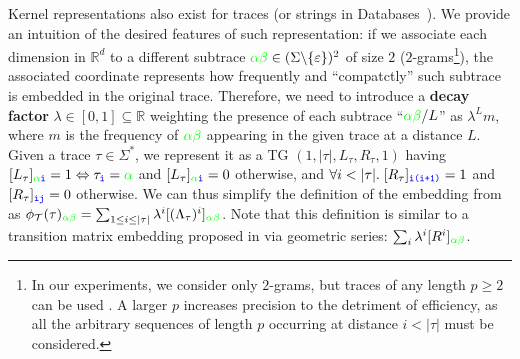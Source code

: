 {Kernel representations also exist for traces (or strings in Databases~\cite{LodhiSSCW02,Raedt,GartnerFW03}). We 
provide an intuition of the desired features of such representation: if we associate each dimension in $\mathbb{R}^d$ to a different subtrace ${\color{green}\alpha\beta}\in(\Sigma\backslash\{\varepsilon\})^2$ of size $2$ ($2$-grams\footnote{\label{fn:caveat}In our experiments, we consider only $2$-grams, but traces of any length $p\geq 2$ can be used \cite{Gartner03}. A larger $p$ increases precision to the detriment of efficiency, as all the arbitrary sequences of length $p$ occurring at distance $i<|\tau|$ must be considered.}), the associated coordinate represents how frequently and ``compatctly'' such subtrace is embedded in the original trace. Therefore, we need to introduce a \textbf{decay factor} $\lambda\in[0,1]\subseteq\mathbb{R}$ weighting the presence of each subtrace ``${\color{green}\alpha\beta}/L$'' as $\lambda^Lm$, where $m$ is the frequency of $\color{green}\alpha\beta$ appearing in the given trace at a distance $L$. Given a trace $\tau\in\Sigma^*$, we represent it as a TG \cite{Myers1989} $(1,{|\tau|},L_\tau,R_\tau,1)$ having $[L_\tau]_{{\color{green}\alpha}\texttt{\color{blue}i}}=1\Leftrightarrow \tau_{\texttt{\color{blue}i}}={\color{green}\alpha}$ and $[L_\tau]_{{\color{green}\alpha}\texttt{\color{blue}i}}=0$ otherwise, and $\forall i<|\tau|.\; [R_\tau]_{\texttt{\color{blue}i(i+1)}}=1 $ and $[R_\tau]_{\texttt{\color{blue}ij}}=0$ otherwise. 
We can thus simplify the definition of the embedding from \cite{LodhiSSCW02,Raedt} as 
$\phi_{\mathcal{T}}(\tau)_{{\color{green}\alpha\beta}}=\sum_{1\leq i\leq |\tau|}\lambda^i[(\Lambda_\tau)^i]_{\color{green}\alpha\beta}$. 
Note that this definition is similar to a transition matrix embedding proposed in \cite{GartnerFW03} via geometric series: 
$\sum_i\lambda^i[R^i]_{\color{green}\alpha\beta}$. 

}
